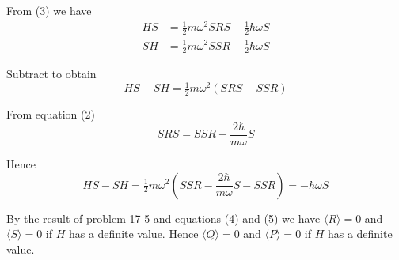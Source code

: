 From (3) we have
\begin{align*}
HS&=\tfrac{1}{2}m\omega^2SRS-\tfrac{1}{2}\hbar\omega S
\\
SH&=\tfrac{1}{2}m\omega^2SSR-\tfrac{1}{2}\hbar\omega S
\end{align*}

Subtract to obtain
\begin{equation*}
HS-SH=\tfrac{1}{2}m\omega^2(SRS-SSR)
\end{equation*}

From equation (2)
\begin{equation*}
SRS=SSR-\frac{2\hbar}{m\omega}S
\end{equation*}

Hence
\begin{equation*}
HS-SH=\tfrac{1}{2}m\omega^2\left(SSR-\frac{2\hbar}{m\omega}S-SSR\right)=-\hbar\omega S\tag{5}
\end{equation*}

By the result of problem 17-5 and equations (4) and (5) we have
$\langle R\rangle=0$ and $\langle S\rangle=0$ if $H$ has a definite
value.
Hence $\langle Q\rangle=0$ and $\langle P\rangle=0$ if $H$ has a definite value.


